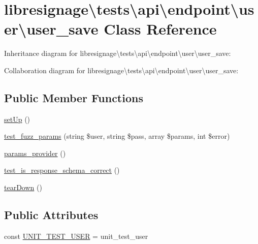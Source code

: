 \hypertarget{classlibresignage_1_1tests_1_1api_1_1endpoint_1_1user_1_1user__save}{}\section{libresignage\textbackslash{}tests\textbackslash{}api\textbackslash{}endpoint\textbackslash{}user\textbackslash{}user\+\_\+save Class Reference}
\label{classlibresignage_1_1tests_1_1api_1_1endpoint_1_1user_1_1user__save}


Inheritance diagram for libresignage\textbackslash{}tests\textbackslash{}api\textbackslash{}endpoint\textbackslash{}user\textbackslash{}user\+\_\+save\+:


Collaboration diagram for libresignage\textbackslash{}tests\textbackslash{}api\textbackslash{}endpoint\textbackslash{}user\textbackslash{}user\+\_\+save\+:
\subsection*{Public Member Functions}
\begin{DoxyCompactItemize}
\item 
\hyperlink{classlibresignage_1_1tests_1_1api_1_1endpoint_1_1user_1_1user__save_a713dc2517048291ab95ea067be9c2f1f}{set\+Up} ()
\item 
\hyperlink{classlibresignage_1_1tests_1_1api_1_1endpoint_1_1user_1_1user__save_a9a0afb51322d944e889d0747d1b38f33}{test\+\_\+fuzz\+\_\+params} (string \$user, string \$pass, array \$params, int \$error)
\item 
\hyperlink{classlibresignage_1_1tests_1_1api_1_1endpoint_1_1user_1_1user__save_a8f8cb7776b4bd3790c9fe9f1d416dea7}{params\+\_\+provider} ()
\item 
\hyperlink{classlibresignage_1_1tests_1_1api_1_1endpoint_1_1user_1_1user__save_af388efc23e95fc9bd0cbc3aa68880d91}{test\+\_\+is\+\_\+response\+\_\+schema\+\_\+correct} ()
\item 
\hyperlink{classlibresignage_1_1tests_1_1api_1_1endpoint_1_1user_1_1user__save_a94ef95cfc1fed24777616b5e56a6a1a4}{tear\+Down} ()
\end{DoxyCompactItemize}
\subsection*{Public Attributes}
\begin{DoxyCompactItemize}
\item 
const \hyperlink{classlibresignage_1_1tests_1_1api_1_1endpoint_1_1user_1_1user__save_a51056e2e430def49adebfa018004f266}{U\+N\+I\+T\+\_\+\+T\+E\+S\+T\+\_\+\+U\+S\+ER} = \textquotesingle{}unit\+\_\+test\+\_\+user\textquotesingle{}
\end{DoxyCompactItemize}
